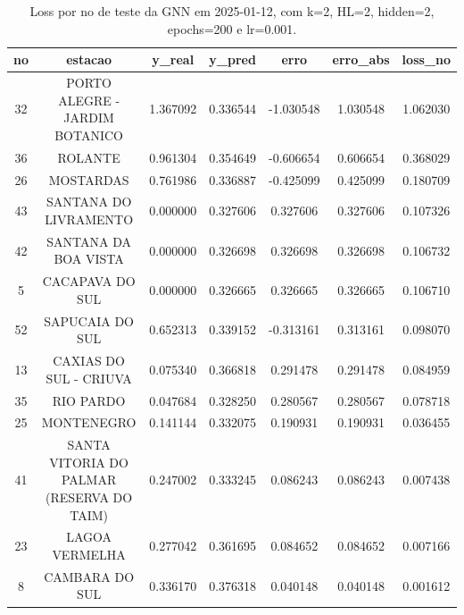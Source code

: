 \begin{table}[h]
\centering
\caption{Loss por no de teste da GNN em 2025-01-12, com k=2, HL=2, hidden=2, epochs=200 e lr=0.001.}
\label{tab:gnn_loss_k2_hl2_h2_e200_d20250112}
\begin{tabular}{ccccccc}
\toprule
no & estacao & y\_real & y\_pred & erro & erro\_abs & loss\_no \\
\midrule
32 & PORTO ALEGRE - JARDIM BOTANICO & 1.367092 & 0.336544 & -1.030548 & 1.030548 & 1.062030 \\
36 & ROLANTE & 0.961304 & 0.354649 & -0.606654 & 0.606654 & 0.368029 \\
26 & MOSTARDAS & 0.761986 & 0.336887 & -0.425099 & 0.425099 & 0.180709 \\
43 & SANTANA DO LIVRAMENTO & 0.000000 & 0.327606 & 0.327606 & 0.327606 & 0.107326 \\
42 & SANTANA DA BOA VISTA & 0.000000 & 0.326698 & 0.326698 & 0.326698 & 0.106732 \\
5 & CACAPAVA DO SUL & 0.000000 & 0.326665 & 0.326665 & 0.326665 & 0.106710 \\
52 & SAPUCAIA DO SUL & 0.652313 & 0.339152 & -0.313161 & 0.313161 & 0.098070 \\
13 & CAXIAS DO SUL - CRIUVA & 0.075340 & 0.366818 & 0.291478 & 0.291478 & 0.084959 \\
35 & RIO PARDO & 0.047684 & 0.328250 & 0.280567 & 0.280567 & 0.078718 \\
25 & MONTENEGRO & 0.141144 & 0.332075 & 0.190931 & 0.190931 & 0.036455 \\
41 & SANTA VITORIA DO PALMAR (RESERVA DO TAIM) & 0.247002 & 0.333245 & 0.086243 & 0.086243 & 0.007438 \\
23 & LAGOA VERMELHA & 0.277042 & 0.361695 & 0.084652 & 0.084652 & 0.007166 \\
8 & CAMBARA DO SUL & 0.336170 & 0.376318 & 0.040148 & 0.040148 & 0.001612 \\
\bottomrule
\end{tabular}
\end{table}

